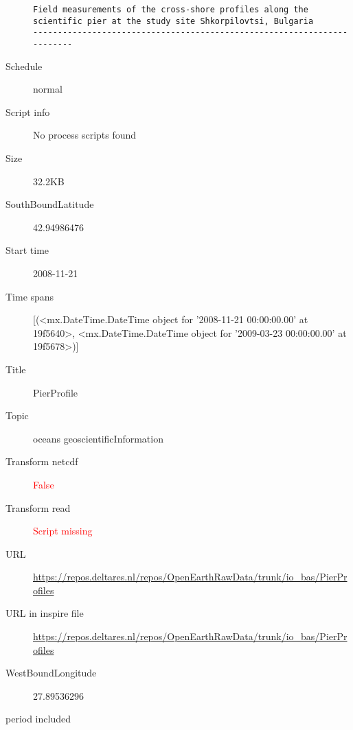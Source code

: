 \documentclass[9]{report}
\begin{document}
\begin{description}
\begin{verbatim}
Field measurements of the cross-shore profiles along the scientific pier at the study site Shkorpilovtsi, Bulgaria
------------------------------------------------------------------------

\end{verbatim}
  \item[Schedule] normal
  \item[Script info] No process scripts found
  \item[Size] 32.2KB
  \item[SouthBoundLatitude] 42.94986476
  \item[Start time] 2008-11-21
  \item[Time spans] [(<mx.DateTime.DateTime object for '2008-11-21 00:00:00.00' at 19f5640>, <mx.DateTime.DateTime object for '2009-03-23 00:00:00.00' at 19f5678>)]
  \item[Title]  PierProfile 
  \item[Topic] oceans geoscientificInformation
  \item[Transform netcdf] \textcolor{red}{False}
  \item[Transform read] \textcolor{red}{Script missing}
  \item[URL] \href{https://repos.deltares.nl/repos/OpenEarthRawData/trunk/io\_bas/PierProfiles}{https://repos.deltares.nl/repos/OpenEarthRawData/trunk/io\_bas/PierProfiles}
  \item[URL in inspire file] \href{https://repos.deltares.nl/repos/OpenEarthRawData/trunk/io\_bas/PierProfiles}{https://repos.deltares.nl/repos/OpenEarthRawData/trunk/io\_bas/PierProfiles}
  \item[WestBoundLongitude] 27.89536296
  \item[period included] 
\end{description}
\end{document}
